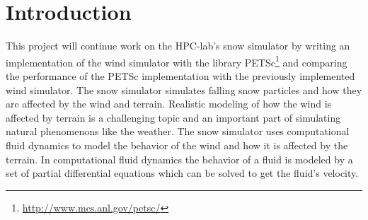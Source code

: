 \chapter{Introduction}

This project will continue work on the HPC-lab's snow simulator by writing an
implementation of the wind simulator with the library
PETSc\footnote{\url{http://www.mcs.anl.gov/petsc/}} and comparing the
performance of the PETSc implementation with the previously implemented wind
simulator. The snow simulator simulates falling snow particles and how they are
affected by the wind and terrain. Realistic modeling of how the wind is affected
by terrain is a challenging topic and an important part of simulating natural
phenomenons like the weather. The snow simulator uses computational fluid
dynamics to model the behavior of the wind and how it is affected by the
terrain. In computational fluid dynamics the behavior of a fluid is modeled by a
set of partial differential equations which can be solved to get the fluid's
velocity.



